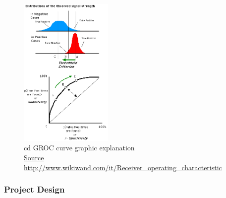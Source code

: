 \documentclass[]{article}
\begin{document}
\begin{figure}[htpb!]
\centering
\includegraphics[width= 0.4\textwidth]{images/ROCfig}
\caption{\centering cd GROC curve graphic explanation \\ \href{http://www.wikiwand.com/it/Receiver_operating_characteristic}{Source http://www.wikiwand.com/it/Receiver\_operating\_characteristic}}
\end{figure}

\subsubsection{Project Design}\label{project-design}

\end{document}
